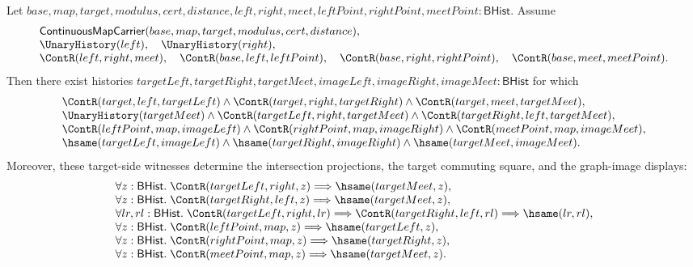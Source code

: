 \begin{theorem}
\label{thm:continuousmap-image-principal-suffix-filter}
Let $base,map,target,modulus,cert,distance,left,right,meet,leftPoint,rightPoint,meetPoint:\mathsf{BHist}$.
Assume
$$
\begin{array}{l}
\mathsf{ContinuousMapCarrier}(base,map,target,modulus,cert,distance),\\
\UnaryHistory(left),\quad \UnaryHistory(right),\\
\ContR(left,right,meet),\quad
\ContR(base,left,leftPoint),\quad
\ContR(base,right,rightPoint),\quad
\ContR(base,meet,meetPoint).
\end{array}
$$
Then there exist histories
$targetLeft,targetRight,targetMeet,imageLeft,imageRight,imageMeet:\mathsf{BHist}$
for which
$$
\begin{array}{l}
\ContR(target,left,targetLeft)\land
\ContR(target,right,targetRight)\land
\ContR(target,meet,targetMeet),\\
\UnaryHistory(targetMeet)\land
\ContR(targetLeft,right,targetMeet)\land
\ContR(targetRight,left,targetMeet),\\
\ContR(leftPoint,map,imageLeft)\land
\ContR(rightPoint,map,imageRight)\land
\ContR(meetPoint,map,imageMeet),\\
\hsame(targetLeft,imageLeft)\land
\hsame(targetRight,imageRight)\land
\hsame(targetMeet,imageMeet).
\end{array}
$$
Moreover, these target-side witnesses determine the intersection projections,
the target commuting square, and the graph-image displays:
$$
\begin{array}{l}
\forall z:\mathsf{BHist}.\;
\ContR(targetLeft,right,z)\Longrightarrow \hsame(targetMeet,z),\\
\forall z:\mathsf{BHist}.\;
\ContR(targetRight,left,z)\Longrightarrow \hsame(targetMeet,z),\\
\forall lr,rl:\mathsf{BHist}.\;
\ContR(targetLeft,right,lr)\Longrightarrow
\ContR(targetRight,left,rl)\Longrightarrow \hsame(lr,rl),\\
\forall z:\mathsf{BHist}.\;
\ContR(leftPoint,map,z)\Longrightarrow \hsame(targetLeft,z),\\
\forall z:\mathsf{BHist}.\;
\ContR(rightPoint,map,z)\Longrightarrow \hsame(targetRight,z),\\
\forall z:\mathsf{BHist}.\;
\ContR(meetPoint,map,z)\Longrightarrow \hsame(targetMeet,z).
\end{array}
$$
\end{theorem}
